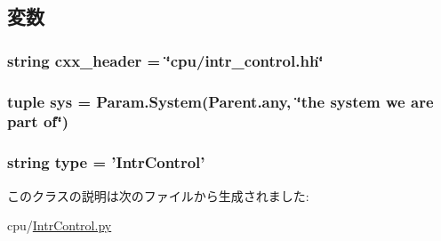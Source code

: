 \subsection{変数}
\hypertarget{classIntrControl_1_1IntrControl_a17da7064bc5c518791f0c891eff05fda}{
\subsubsection[{cxx\_\-header}]{\setlength{\rightskip}{0pt plus 5cm}string {\bf cxx\_\-header} = \char`\"{}cpu/intr\_\-control.hh\char`\"{}}}
\label{classIntrControl_1_1IntrControl_a17da7064bc5c518791f0c891eff05fda}
\hypertarget{classIntrControl_1_1IntrControl_a1f27497e90bf86cc0b513e5c086c9e19}{
\subsubsection[{sys}]{\setlength{\rightskip}{0pt plus 5cm}tuple {\bf sys} = Param.System(Parent.any, \char`\"{}the system we are part of\char`\"{})}}
\label{classIntrControl_1_1IntrControl_a1f27497e90bf86cc0b513e5c086c9e19}
\hypertarget{classIntrControl_1_1IntrControl_acce15679d830831b0bbe8ebc2a60b2ca}{
\subsubsection[{type}]{\setlength{\rightskip}{0pt plus 5cm}string {\bf type} = '{\bf IntrControl}'}}
\label{classIntrControl_1_1IntrControl_acce15679d830831b0bbe8ebc2a60b2ca}


このクラスの説明は次のファイルから生成されました:\begin{DoxyCompactItemize}
\item 
cpu/\hyperlink{IntrControl_8py}{IntrControl.py}\end{DoxyCompactItemize}
